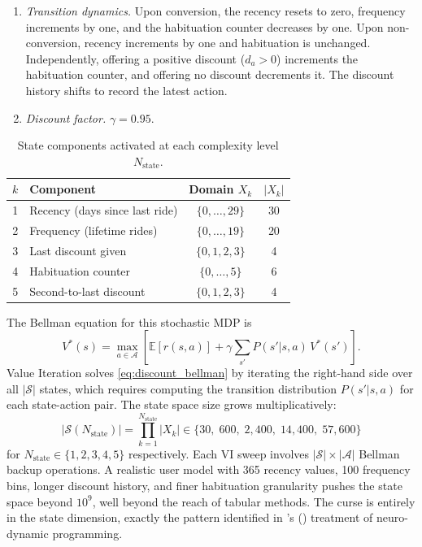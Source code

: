 \begin{definition}
\begin{enumerate}
    \item \emph{Transition dynamics.} Upon conversion, the recency resets to zero, frequency increments by one, and the habituation counter decreases by one. Upon non-conversion, recency increments by one and habituation is unchanged. Independently, offering a positive discount ($d_a > 0$) increments the habituation counter, and offering no discount decrements it. The discount history shifts to record the latest action.

    \item \emph{Discount factor.} $\gamma = 0.95$.
\end{enumerate}
\end{definition}

\begin{table}[h!]
\centering
\caption{State components activated at each complexity level $N_{\mathrm{state}}$.}
\label{tab:discount_state_components}
\begin{tabular}{clcc}
\toprule
$k$ & Component & Domain $X_k$ & $|X_k|$ \\
\midrule
1 & Recency (days since last ride) & $\{0, \ldots, 29\}$ & 30 \\
2 & Frequency (lifetime rides) & $\{0, \ldots, 19\}$ & 20 \\
3 & Last discount given & $\{0, 1, 2, 3\}$ & 4 \\
4 & Habituation counter & $\{0, \ldots, 5\}$ & 6 \\
5 & Second-to-last discount & $\{0, 1, 2, 3\}$ & 4 \\
\bottomrule
\end{tabular}
\end{table}

The Bellman equation for this stochastic MDP is
\begin{equation}
\label{eq:discount_bellman}
V^*(s) = \max_{a \in \mathcal{A}} \left[ \mathbb{E}[r(s,a)] + \gamma \sum_{s'} P(s' | s, a) \, V^*(s') \right].
\end{equation}
Value Iteration solves \eqref{eq:discount_bellman} by iterating the right-hand side over all $|\mathcal{S}|$ states, which requires computing the transition distribution $P(s'|s,a)$ for each state-action pair. The state space size grows multiplicatively:
\begin{equation}
|\mathcal{S}(N_{\mathrm{state}})| = \prod_{k=1}^{N_{\mathrm{state}}} |X_k| \in \{30,\; 600,\; 2{,}400,\; 14{,}400,\; 57{,}600\}
\end{equation}
for $N_{\mathrm{state}} \in \{1, 2, 3, 4, 5\}$ respectively. Each VI sweep involves $|\mathcal{S}| \times |\mathcal{A}|$ Bellman backup operations. A realistic user model with 365 recency values, 100 frequency bins, longer discount history, and finer habituation granularity pushes the state space beyond $10^9$, well beyond the reach of tabular methods. The curse is entirely in the state dimension, exactly the pattern identified in \citeauthor{bertsekas1996}'s (\citeyear{bertsekas1996}) treatment of neuro-dynamic programming.

